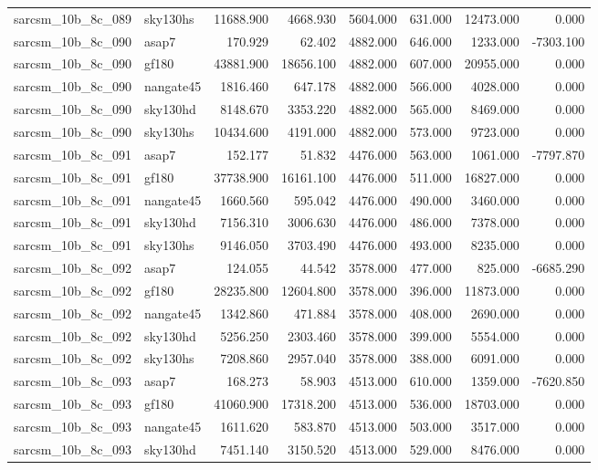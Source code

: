 \begin{tabular}{llrrrrrr}
sarcsm\_10b\_8c\_089 & sky130hs & 11688.900 & 4668.930 & 5604.000 & 631.000 & 12473.000 & 0.000 \\
sarcsm\_10b\_8c\_090 & asap7 & 170.929 & 62.402 & 4882.000 & 646.000 & 1233.000 & -7303.100 \\
sarcsm\_10b\_8c\_090 & gf180 & 43881.900 & 18656.100 & 4882.000 & 607.000 & 20955.000 & 0.000 \\
sarcsm\_10b\_8c\_090 & nangate45 & 1816.460 & 647.178 & 4882.000 & 566.000 & 4028.000 & 0.000 \\
sarcsm\_10b\_8c\_090 & sky130hd & 8148.670 & 3353.220 & 4882.000 & 565.000 & 8469.000 & 0.000 \\
sarcsm\_10b\_8c\_090 & sky130hs & 10434.600 & 4191.000 & 4882.000 & 573.000 & 9723.000 & 0.000 \\
sarcsm\_10b\_8c\_091 & asap7 & 152.177 & 51.832 & 4476.000 & 563.000 & 1061.000 & -7797.870 \\
sarcsm\_10b\_8c\_091 & gf180 & 37738.900 & 16161.100 & 4476.000 & 511.000 & 16827.000 & 0.000 \\
sarcsm\_10b\_8c\_091 & nangate45 & 1660.560 & 595.042 & 4476.000 & 490.000 & 3460.000 & 0.000 \\
sarcsm\_10b\_8c\_091 & sky130hd & 7156.310 & 3006.630 & 4476.000 & 486.000 & 7378.000 & 0.000 \\
sarcsm\_10b\_8c\_091 & sky130hs & 9146.050 & 3703.490 & 4476.000 & 493.000 & 8235.000 & 0.000 \\
sarcsm\_10b\_8c\_092 & asap7 & 124.055 & 44.542 & 3578.000 & 477.000 & 825.000 & -6685.290 \\
sarcsm\_10b\_8c\_092 & gf180 & 28235.800 & 12604.800 & 3578.000 & 396.000 & 11873.000 & 0.000 \\
sarcsm\_10b\_8c\_092 & nangate45 & 1342.860 & 471.884 & 3578.000 & 408.000 & 2690.000 & 0.000 \\
sarcsm\_10b\_8c\_092 & sky130hd & 5256.250 & 2303.460 & 3578.000 & 399.000 & 5554.000 & 0.000 \\
sarcsm\_10b\_8c\_092 & sky130hs & 7208.860 & 2957.040 & 3578.000 & 388.000 & 6091.000 & 0.000 \\
sarcsm\_10b\_8c\_093 & asap7 & 168.273 & 58.903 & 4513.000 & 610.000 & 1359.000 & -7620.850 \\
sarcsm\_10b\_8c\_093 & gf180 & 41060.900 & 17318.200 & 4513.000 & 536.000 & 18703.000 & 0.000 \\
sarcsm\_10b\_8c\_093 & nangate45 & 1611.620 & 583.870 & 4513.000 & 503.000 & 3517.000 & 0.000 \\
sarcsm\_10b\_8c\_093 & sky130hd & 7451.140 & 3150.520 & 4513.000 & 529.000 & 8476.000 & 0.000 \\

\end{tabular}
